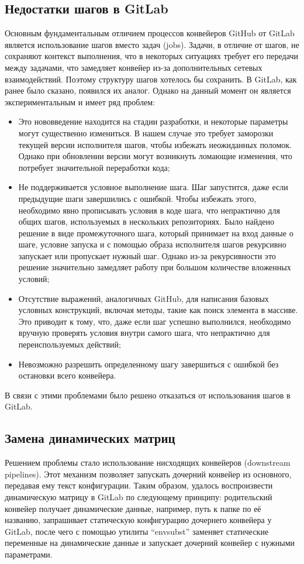 \subsection{Недостатки шагов в GitLab} \label{subsec:gitlab-steps-problems}
Основным фундаментальным отличием процессов конвейеров GitHub от GitLab является использование шагов вместо задач (jobs).
Задачи, в отличие от шагов, не сохраняют контекст выполнения, что в некоторых ситуациях требует его передачи между задачами,
что замедляет конвейер из-за дополнительных сетевых взаимодействий.
Поэтому структуру шагов хотелось бы сохранить.
В GitLab, как ранее было сказано, появился их аналог.
Однако на данный момент он является экспериментальным и имеет ряд проблем:
\begin{itemize}
  \item Это нововведение находится на стадии разработки, и некоторые параметры могут существенно измениться.
        В нашем случае это требует заморозки текущей версии исполнителя шагов, чтобы избежать неожиданных поломок.
        Однако при обновлении версии могут возникнуть ломающие изменения, что потребует значительной переработки кода;
  \item Не поддерживается условное выполнение шага.
        Шаг запустится, даже если предыдущие шаги завершились с ошибкой.
        Чтобы избежать этого, необходимо явно прописывать условия в коде шага, что непрактично для общих шагов, используемых в нескольких репозиториях.
        Было найдено решение в виде промежуточного шага, который принимает на вход данные о шаге, условие запуска и с помощью образа исполнителя шагов рекурсивно запускает или пропускает нужный шаг.
        Однако из-за рекурсивности это решение значительно замедляет работу при большом количестве вложенных условий;
  \item Отсутствие выражений, аналогичных GitHub, для написания базовых условных конструкций, включая методы, такие как поиск элемента в массиве.
        Это приводит к тому, что, даже если шаг успешно выполнился, необходимо вручную проверять условия внутри самого шага, что непрактично для переиспользуемых действий;
  \item Невозможно разрешить определенному шагу завершиться с ошибкой без остановки всего конвейера.
\end{itemize}

В связи с этими проблемами было решено отказаться от использования шагов в GitLab.

\subsection{Замена динамических матриц} \label{subsec:dymamic-matricies}
Решением проблемы стало использование нисходящих конвейеров (downstream pipelines).
Этот механизм позволяет запускать дочерний конвейер из основного, передавая ему текст конфигурации.
Таким образом, удалось воспроизвести динамическую матрицу в GitLab по следующему принципу:
родительский конвейер получает динамические данные, например, путь к папке по её названию,
запрашивает статическую конфигурацию дочернего конвейера у GitLab,
после чего с помощью утилиты \enquote{envsubst} заменяет статические переменные на динамические данные и запускает дочерний конвейер с нужными параметрами.

